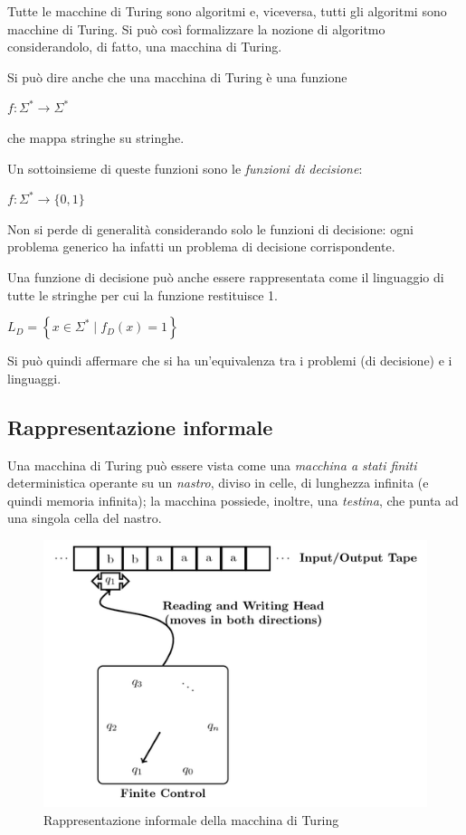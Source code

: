 Tutte le macchine di Turing sono algoritmi e, viceversa, tutti gli algoritmi sono macchine di Turing.
Si può così formalizzare la nozione di algoritmo considerandolo, di fatto, una macchina di Turing.

Si può dire anche che una macchina di Turing è una funzione
\begin{center}
    $f:  \Sigma^* \rightarrow \Sigma^*$
\end{center}
che mappa stringhe su stringhe.

Un sottoinsieme di queste funzioni sono le \textit{funzioni di decisione}:
\begin{center}
    $f: \Sigma^* \rightarrow \{ 0, 1 \}$
\end{center}
Non si perde di generalità considerando solo le funzioni di decisione: ogni problema generico ha infatti un problema di decisione corrispondente.

Una funzione di decisione  può anche essere rappresentata come il linguaggio di tutte le stringhe per cui la funzione restituisce 1.
\begin{center}
    $L_D = \left\{ x \in \Sigma^* \; | \; f_D (x) = 1 \right\}$
\end{center}
Si può quindi affermare che si ha un'equivalenza tra i problemi (di decisione) e i linguaggi.
\subsection*{Rappresentazione informale}
Una macchina di Turing può essere vista come una \textit{macchina a stati finiti} deterministica operante su un \textit{nastro}, diviso in celle, di lunghezza infinita (e quindi memoria infinita); la macchina possiede, inoltre, una \textit{testina}, che punta ad una singola cella del nastro.
\begin{figure}[h]
    \centering
    \includegraphics[width=0.5\linewidth]{img/turing_machine.png}
    \caption{Rappresentazione informale della macchina di Turing}
    \label{fig:turing_machine}
\end{figure}

